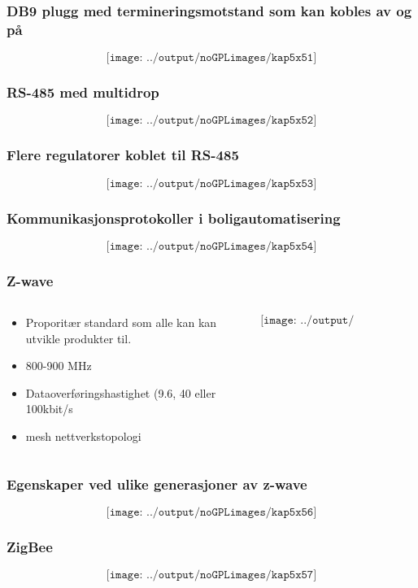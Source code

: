 \documentclass[aspectratio=169,xcolor=dvipsnames]{beamer}
\begin{document}
\begin{frame}
	\frametitle{DB9 plugg med termineringsmotstand som kan kobles av og på}
	$$\texttt{[image: ../output/noGPLimages/kap5x51]}$$
\end{frame}
\begin{frame}
	\frametitle{RS-485 med multidrop}
	$$\texttt{[image: ../output/noGPLimages/kap5x52]}$$
\end{frame}
\begin{frame}
	\frametitle{Flere regulatorer koblet til RS-485}
	$$\texttt{[image: ../output/noGPLimages/kap5x53]}$$
\end{frame}
\begin{frame}
	\frametitle{Kommunikasjonsprotokoller i boligautomatisering}
	$$\texttt{[image: ../output/noGPLimages/kap5x54]}$$
\end{frame}
\begin{frame}
	\frametitle{Z-wave}
	\begin{columns}
		\begin{column}{0.5\textwidth}

			\begin{itemize}
				\item Proporitær standard som alle kan kan utvikle produkter til. 
				\item 800-900 MHz
				\item Dataoverføringshastighet (9.6, 40 eller 100kbit/s
				\item mesh nettverkstopologi
			\end{itemize}

			
		\end{column}

		\begin{column}{0.5\textwidth}
	$$\texttt{[image: ../output/noGPLimages/kap5x55]}$$
		\end{column}
	\end{columns}
\end{frame}
\begin{frame}
	\frametitle{Egenskaper ved ulike generasjoner av z-wave}
	$$\texttt{[image: ../output/noGPLimages/kap5x56]}$$
\end{frame}
\begin{frame}
	\frametitle{ZigBee}
	$$\texttt{[image: ../output/noGPLimages/kap5x57]}$$
\end{frame}
\end{document}
